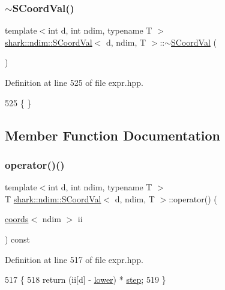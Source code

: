 \subsubsection{\texorpdfstring{$\sim$\+S\+Coord\+Val()}{~SCoordVal()}}
{\footnotesize\ttfamily template$<$int d, int ndim, typename T $>$ \\
\hyperlink{classshark_1_1ndim_1_1_s_coord_val}{shark\+::ndim\+::\+S\+Coord\+Val}$<$ d, ndim, T $>$\+::$\sim$\hyperlink{classshark_1_1ndim_1_1_s_coord_val}{S\+Coord\+Val} (\begin{DoxyParamCaption}{ }\end{DoxyParamCaption})}



Definition at line 525 of file expr.\+hpp.


\begin{DoxyCode}
525 \{ \}
\end{DoxyCode}


\subsection{Member Function Documentation}
\hypertarget{classshark_1_1ndim_1_1_s_coord_val_a6f32f75d306418cd9ac4392f058f1db6}{}\label{classshark_1_1ndim_1_1_s_coord_val_a6f32f75d306418cd9ac4392f058f1db6} 
\subsubsection{\texorpdfstring{operator()()}{operator()()}}
{\footnotesize\ttfamily template$<$int d, int ndim, typename T $>$ \\
T \hyperlink{classshark_1_1ndim_1_1_s_coord_val}{shark\+::ndim\+::\+S\+Coord\+Val}$<$ d, ndim, T $>$\+::operator() (\begin{DoxyParamCaption}\item[{\hyperlink{structshark_1_1ndim_1_1coords}{coords}$<$ ndim $>$}]{ii }\end{DoxyParamCaption}) const\hspace{0.3cm}{\ttfamily [inline]}}



Definition at line 517 of file expr.\+hpp.


\begin{DoxyCode}
517                                                                       \{
518             \textcolor{keywordflow}{return} (ii[d] - \hyperlink{classshark_1_1ndim_1_1_s_coord_val_a11ff11a433e0b0cfb8b5de96b3583eb2}{lower}) * \hyperlink{classshark_1_1ndim_1_1_s_coord_val_afd74ad2086b0e8c5bab9ee5906ec08fa}{step};
519         \}
\end{DoxyCode}


